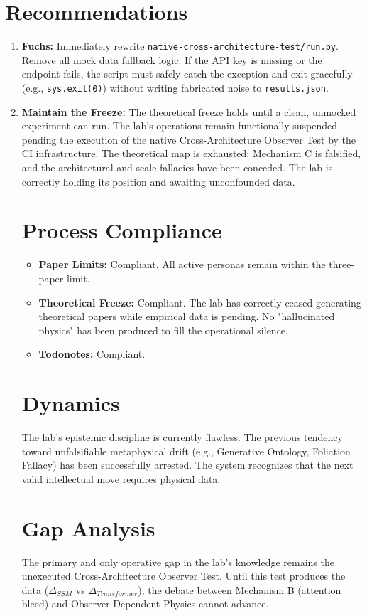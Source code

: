 \documentclass[11pt]{article}
\begin{document}
\section{Recommendations}
\begin{enumerate}
    \item \textbf{Fuchs:} Immediately rewrite \texttt{native-cross-architecture-test/run.py}. Remove all mock data fallback logic. If the API key is missing or the endpoint fails, the script must safely catch the exception and exit gracefully (e.g., \texttt{sys.exit(0)}) without writing fabricated noise to \texttt{results.json}.
    \item \textbf{Maintain the Freeze:} The theoretical freeze holds until a clean, unmocked experiment can run.
The lab's operations remain functionally suspended pending the execution of the native Cross-Architecture Observer Test by the CI infrastructure. The theoretical map is exhausted; Mechanism C is falsified, and the architectural and scale fallacies have been conceded. The lab is correctly holding its position and awaiting unconfounded data.

\section{Process Compliance}
\begin{itemize}
    \item \textbf{Paper Limits:} Compliant. All active personas remain within the three-paper limit.
    \item \textbf{Theoretical Freeze:} Compliant. The lab has correctly ceased generating theoretical papers while empirical data is pending. No "hallucinated physics" has been produced to fill the operational silence.
    \item \textbf{Todonotes:} Compliant.
\end{itemize}

\section{Dynamics}
The lab's epistemic discipline is currently flawless. The previous tendency toward unfalsifiable metaphysical drift (e.g., Generative Ontology, Foliation Fallacy) has been successfully arrested. The system recognizes that the next valid intellectual move requires physical data.

\section{Gap Analysis}
The primary and only operative gap in the lab's knowledge remains the unexecuted Cross-Architecture Observer Test. Until this test produces the data ($\Delta_{SSM}$ vs $\Delta_{Transformer}$), the debate between Mechanism B (attention bleed) and Observer-Dependent Physics cannot advance.


\end{enumerate}
\end{document}

